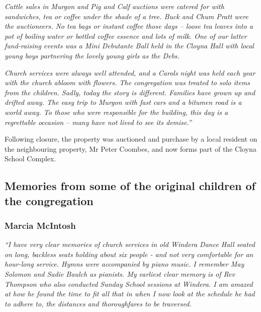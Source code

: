 \emph{Cattle sales in Murgon and Pig and Calf auctions were catered for with sandwiches, tea or coffee under the shade of a tree. Buck and Chum Pratt were the auctioneers. No tea bags or instant coffee those days -- loose tea leaves into a pot of boiling water or bottled coffee essence and lots of milk. One of our latter fund-raising events was a Mini Debutante Ball held in the Cloyna Hall with local young boys partnering the lovely young girls as the Debs.}



\emph{Church services were always well attended, and a Carols night was held each year with the church abloom with flowers. The congregation was treated to solo items from the children. Sadly, today the story is different. Families have grown up and drifted away. The easy trip to Murgon with fast cars and a bitumen road is a world away. To those who were responsible for the building, this day is a regrettable occasion -- many have not lived to see its demise.''}



Following closure, the property was auctioned and purchase by a local resident on the neighbouring property, Mr Peter Coombes, and now forms part of the Cloyna School Complex.



\subsection{Memories from some of the original children of the congregation}



\subsubsection{Marcia McIntosh}



\emph{``I have very clear memories of church services in old Windera Dance Hall seated on long, backless seats holding about six people - and not very comfortable for an hour-long service. Hymns were accompanied by piano music. I remember May Solomon and Sadie Baulch as pianists. My earliest clear memory is of Rev Thompson who also conducted Sunday School sessions at Windera. I am amazed at how he found the time to fit all that in when I now look at the schedule he had to adhere to, the distances and thoroughfares to be traversed.}



